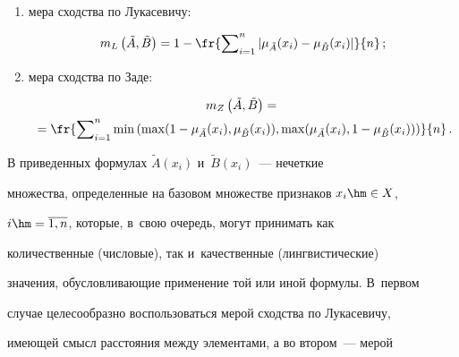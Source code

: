   \begin{enumerate}[(1)]


  \item  мера сходства по Лукасевичу:


  


  \noindent


  $$


  m_L\left( \tilde{A},\tilde{B}\right) =1-\fr{\sum\nolimits^n_{i=1} \vert 


\mu_{\tilde{A}}(x_i)-\mu_{\tilde{B}}(x_i)\vert}{n}\,;


  $$


  \item мера сходства по Заде:


  


\vspace*{-3pt}





  \noindent


\begin{multline*}


  m_Z\left(\tilde{A},\tilde{B}\right) ={}\\


  {}=\fr{\sum\nolimits^n_{i=1} \min \left(\max 


(1-\mu_{\tilde{A}}(x_i), \mu_{\tilde{B}}(x_i)), \max (\mu_{\tilde{A}}(x_i), 1-


\mu_{\tilde{B}}(x_i))\right)}{n}\,.


\end{multline*}


  \end{enumerate}


  


  В приведенных формулах $\tilde{A}(x_i)$ и~$\tilde{B}(x_i)$~--- нечеткие 


множества, определенные на базовом множестве признаков $x_i\hm\in X$, 


$i\hm=\overline{1,n}$, которые, в~свою очередь, могут принимать как 


количественные (числовые), так и~качественные (лингвистические) 


значения, обусловливающие применение той или иной формулы. В~первом 


случае целесообразно воспользоваться мерой сходства по Лукасевичу, 


имеющей смысл расстояния между элементами, а во втором~--- мерой 


